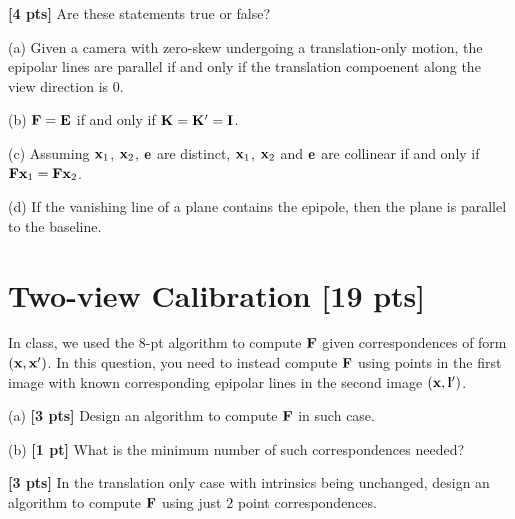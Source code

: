 \documentclass[11pt,addpoints,answers]{exam}
\numberwithin{equation}{section} %
\numberwithin{figure}{section} %
\numberwithin{table}{section} %
\begin{document}
\begin{questions}
\begin{tcolorbox}[fit,height=4.5cm, width=\textwidth, blank, borderline={0.5pt}{-2pt},halign=left, valign=center, nobeforeafter]
\end{tcolorbox}
\clearpage
\question \textbf{[4 pts]} Are these statements true or false?  

(a) Given a camera with zero-skew undergoing a translation-only motion, the epipolar lines are parallel if and only if the translation compoenent along the view direction is $0$.

(b) $\mathbf{F} = \mathbf{E}$ if and only if $\mathbf{K} = \mathbf{K}' = \mathbf{I}$. 

(c) Assuming $\mathbf{x}_1$, $\mathbf{x}_2$, $\mathbf{e}$ are distinct, $\mathbf{x}_1$, $\mathbf{x}_2$ and $\mathbf{e}$ are collinear if and only if $\mathbf{F}\mathbf{x}_1 = \mathbf{F}\mathbf{x}_2$.

(d) If the vanishing line of a plane contains the epipole, then the plane is parallel to the baseline.

\begin{tcolorbox}[fit,height=4cm, width=\textwidth, blank, borderline={0.5pt}{-2pt},halign=left, valign=center, nobeforeafter]


\end{tcolorbox}

\section{Two-view Calibration [19 pts]}
\question In class, we used the $8$-pt algorithm to compute $\mathbf{F}$ given correspondences of form $(\mathbf{x}, \mathbf{x}')$. In this question, you need to instead compute $\mathbf{F}$ using points in the first image with known corresponding epipolar lines in the second image $(\mathbf{x}, \mathbf{l}')$.

(a) \textbf{[3 pts]} Design an algorithm to compute $\mathbf{F}$ in such case. 

(b) \textbf{[1 pt]} What is the minimum number of such correspondences needed?

\begin{tcolorbox}[fit,height=5cm, width=\textwidth, blank, borderline={0.5pt}{-2pt},halign=left, valign=center, nobeforeafter]


\end{tcolorbox}

\question \textbf{[3 pts]} In the translation only case with intrinsics being unchanged, design an algorithm to compute $\mathbf{F}$ using just $2$ point correspondences.

\begin{tcolorbox}[fit,height=5cm, width=\textwidth, blank, borderline={0.5pt}{-2pt},halign=left, valign=center, nobeforeafter]


\end{tcolorbox}


\end{questions}
\end{document}

